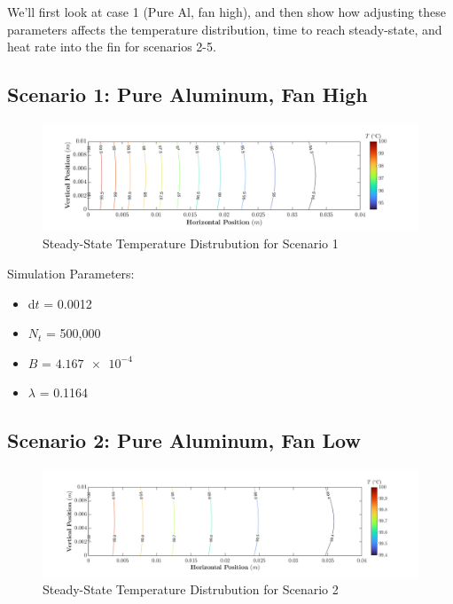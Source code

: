 \documentclass{article}
\begin{document}
We'll first look at case 1 (Pure Al, fan high), and then show how adjusting these parameters affects the temperature distribution, time to reach steady-state, and heat rate into the fin for scenarios 2-5.

\pagebreak

\subsection{Scenario 1: Pure Aluminum, Fan High}

\begin{figure}[h]
    \centering
    \includegraphics[width=1\textwidth]{fig/contour1.png}
    \caption{Steady-State Temperature Distrubution for Scenario 1}
    \label{fig: Plot1}
\end{figure}

Simulation Parameters:
\begin{itemize}
    \item d$t$ = 0.0012
    \item $N_t$ = 500,000
    \item $B$ = $\SI{4.167e-4}{}$
    \item $\lambda$ = 0.1164
\end{itemize}

\pagebreak

\subsection{Scenario 2: Pure Aluminum, Fan Low}

\begin{figure}[h]
    \centering
    \includegraphics[width=1\textwidth]{fig/contour2.png}
    \caption{Steady-State Temperature Distrubution for Scenario 2}
    \label{fig: Plot2}
\end{figure}
\end{document}
